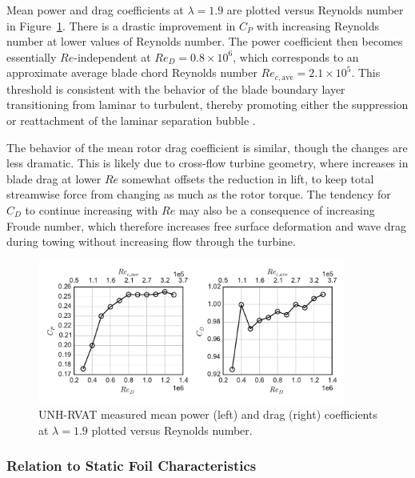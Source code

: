 \documentclass[energies,article,accept,moreauthors,pdftex,12pt,a4paper]{mdpi}
\begin{document}
Mean power and drag coefficients at $\lambda=1.9$ are plotted versus Reynolds
number in Figure~\ref{fig:perf-Re-dep}. There is a drastic improvement in $C_P$
with increasing Reynolds number at lower values of Reynolds number. The power
coefficient then becomes  essentially $Re$-independent at $Re_D = 0.8 \times
10^6$, which corresponds to an approximate average blade chord Reynolds number
$Re_{c, \mathrm{ave}} = 2.1 \times 10^5$. This threshold is consistent with the
behavior of the blade boundary layer transitioning from laminar to turbulent,
thereby promoting either the suppression or reattachment of the laminar
separation bubble \cite{Lissaman1983}.

The behavior of the mean rotor drag coefficient is similar, though the changes
are less dramatic. This is likely due to cross-flow turbine geometry, where
increases in blade drag at lower $Re$ somewhat offsets the reduction in lift, to
keep total streamwise force from changing as much as the rotor torque. The
tendency for $C_D$ to continue increasing with $Re$ may also be a consequence of
increasing Froude number, which therefore increases free surface deformation and
wave drag during towing without increasing flow through the turbine.

\begin{figure}[ht]
\centering

\includegraphics[width=0.9\textwidth]{figures/perf_re_dep}

\caption{UNH-RVAT measured mean power (left) and drag (right) coefficients at
    $\lambda=1.9$ plotted versus Reynolds number.}

\label{fig:perf-Re-dep}
\end{figure}


\subsubsection{Relation to Static Foil Characteristics}
\end{document}
